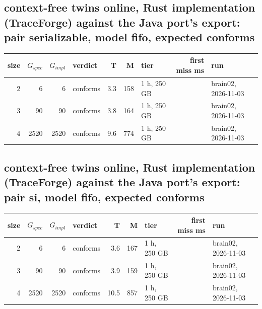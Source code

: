 \documentclass[10pt]{article}
\begin{document}
\subsection*{context-free twins online, Rust implementation (TraceForge) against the Java port's export: pair \textsf{serializable}, model fifo, expected conforms}
\begin{longtable}{@{}rrrlrrlrl@{}}
\toprule
size & $G_{\mathit{spec}}$ & $G_{\mathit{impl}}$ & verdict & T & M & tier & first miss ms & run \\
\midrule
\endhead
\color{red} 2 & 6 & 6 & conforms & 3.3 & 158 & 1 h, 250 GB &  & brain02, 2026-11-03 \\
\color{red} 3 & 90 & 90 & conforms & 3.8 & 164 & 1 h, 250 GB &  & brain02, 2026-11-03 \\
\color{red} 4 & 2520 & 2520 & conforms & 9.6 & 774 & 1 h, 250 GB &  & brain02, 2026-11-03 \\
\bottomrule
\end{longtable}
\subsection*{context-free twins online, Rust implementation (TraceForge) against the Java port's export: pair \textsf{si}, model fifo, expected conforms}
\begin{longtable}{@{}rrrlrrlrl@{}}
\toprule
size & $G_{\mathit{spec}}$ & $G_{\mathit{impl}}$ & verdict & T & M & tier & first miss ms & run \\
\midrule
\endhead
\color{red} 2 & 6 & 6 & conforms & 3.6 & 167 & 1 h, 250 GB &  & brain02, 2026-11-03 \\
\color{red} 3 & 90 & 90 & conforms & 3.9 & 159 & 1 h, 250 GB &  & brain02, 2026-11-03 \\
\color{red} 4 & 2520 & 2520 & conforms & 10.5 & 857 & 1 h, 250 GB &  & brain02, 2026-11-03 \\
\bottomrule
\end{longtable}
\end{document}
